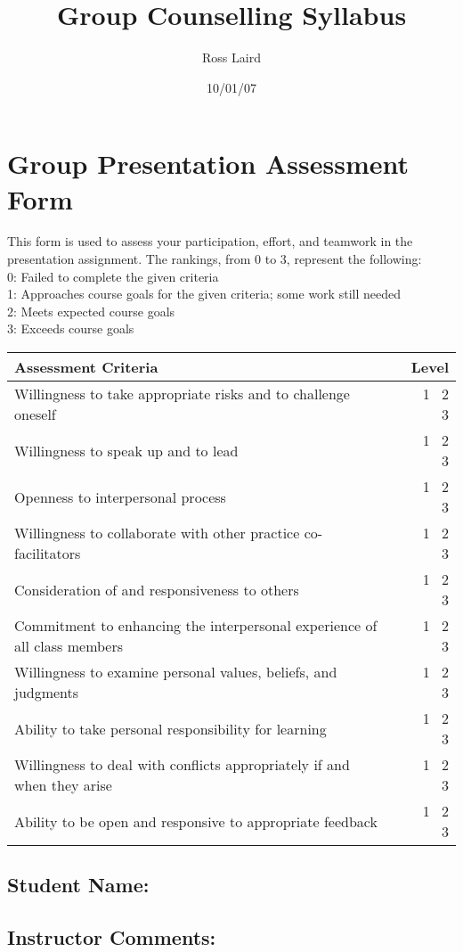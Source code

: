 \documentclass[letterpaper,12pt,headsepline]{scrreprt}
\author{Ross Laird}
\title{Group Counselling Syllabus}
\date{10/01/07}
\begin{document}
\pagestyle{scrheadings}
\setcounter{secnumdepth}{-1}

\section{Group Presentation Assessment Form}


This form is used to assess your participation, effort, and teamwork
in the presentation assignment. The rankings, from 0 to 3, represent the following:\\
0: Failed to complete the given criteria\\
1: Approaches course goals for the given criteria; some work still needed\\
2: Meets expected course goals\\
3: Exceeds course goals\\

\begin{tabular}{|l|r|}
\hline
Assessment Criteria & Level\\
\hline
Willingness to take appropriate risks and to challenge oneself & \ 1 \ 2 \ 3 \\
Willingness to speak up and to lead & \ 1 \ 2 \ 3 \\
Openness to interpersonal process & \ 1 \ 2 \ 3 \\
Willingness to collaborate with other practice co-facilitators & \ 1 \ 2 \ 3 \\
Consideration of and responsiveness to others & \ 1 \ 2 \ 3 \\
Commitment to enhancing the interpersonal experience of all class members & \ 1 \ 2 \ 3 \\
Willingness to examine personal values, beliefs, and judgments & \ 1 \ 2 \ 3 \\
Ability to take personal responsibility for learning & \ 1 \ 2 \ 3 \\
Willingness to deal with conflicts appropriately if and when they arise & \ 1 \ 2 \ 3 \\
Ability to be open and responsive to appropriate feedback & \ 1 \ 2 \ 3 \\
\hline
\end{tabular}

\subsection{Student Name:}

\subsection{Instructor Comments:}
\end{document}
